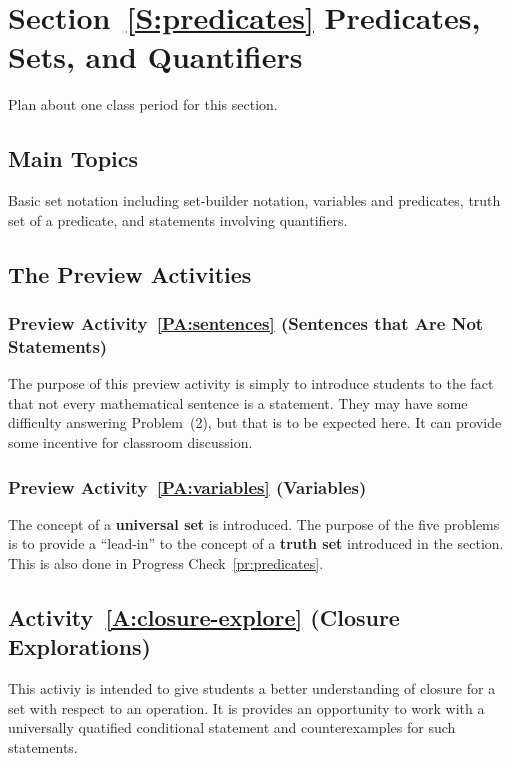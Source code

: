 \section*{Section~\ref{S:predicates} Predicates, Sets, and Quantifiers}
Plan about one class period for this section.

\subsection*{Main Topics}
Basic set notation including set-builder notation, variables and predicates, truth set of a predicate, and statements involving quantifiers.

\subsection*{The Preview Activities}
\subsubsection*{Preview Activity~\ref{PA:sentences} (Sentences that Are Not Statements)} 
The purpose of this preview activity is simply to introduce students to the fact that not every mathematical sentence is a statement.  They may have some difficulty answering Problem~(2), but that is to be expected here.  It can provide some incentive for classroom discussion.

\subsubsection*{Preview Activity~\ref{PA:variables} (Variables)}  
The concept of a \textbf{universal set} is introduced.  The purpose of the five problems is to provide a ``lead-in'' to the concept of a \textbf{truth set} introduced in the section.  This is also done in Progress Check~\ref{pr:predicates}.
\hbreak

\subsection*{Activity~\ref{A:closure-explore} (Closure Explorations)}
This activiy is intended to give students a better understanding of closure for a set with respect to an operation.  It is provides an opportunity to work with a universally quatified conditional statement and counterexamples for such statements.
\hbreak

